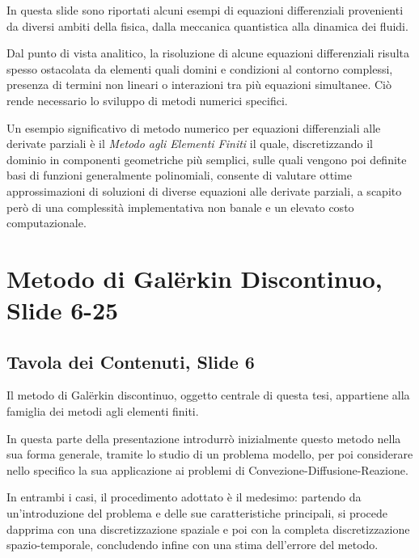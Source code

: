 \documentclass[12pt]{article}
\begin{document}
    In questa slide sono riportati alcuni esempi di equazioni differenziali provenienti da diversi ambiti della fisica, dalla meccanica quantistica alla dinamica dei fluidi.

    Dal punto di vista analitico, la risoluzione di alcune equazioni differenziali risulta spesso ostacolata da elementi quali domini e condizioni al contorno complessi, presenza di termini non lineari o interazioni tra più equazioni simultanee. Ciò rende necessario lo sviluppo di metodi numerici specifici.

    Un esempio significativo di metodo numerico per equazioni differenziali alle derivate parziali è il \textit{Metodo agli Elementi Finiti} il quale, discretizzando il dominio in componenti geometriche più semplici, sulle quali vengono poi definite basi di funzioni generalmente polinomiali, consente di valutare ottime approssimazioni di soluzioni di diverse equazioni alle derivate parziali, a scapito però di una complessità implementativa non banale e un elevato costo computazionale.


    \newpage
    \section{Metodo di Galërkin Discontinuo, Slide 6-25}

    \subsection{Tavola dei Contenuti, Slide 6}

    Il metodo di Galërkin discontinuo, oggetto centrale di questa tesi, appartiene alla famiglia dei metodi agli elementi finiti.

    {\color{gray} In questa parte della presentazione introdurrò inizialmente questo metodo nella sua forma generale, tramite lo studio di un problema modello, per poi considerare nello specifico la sua applicazione ai problemi di Convezione-Diffusione-Reazione.

    In entrambi i casi, il procedimento adottato è il medesimo: partendo da un'introduzione del problema e delle sue caratteristiche principali, si procede dapprima con una discretizzazione spaziale e poi con la completa discretizzazione spazio-temporale, concludendo infine con una stima dell'errore del metodo.}
\end{document}
